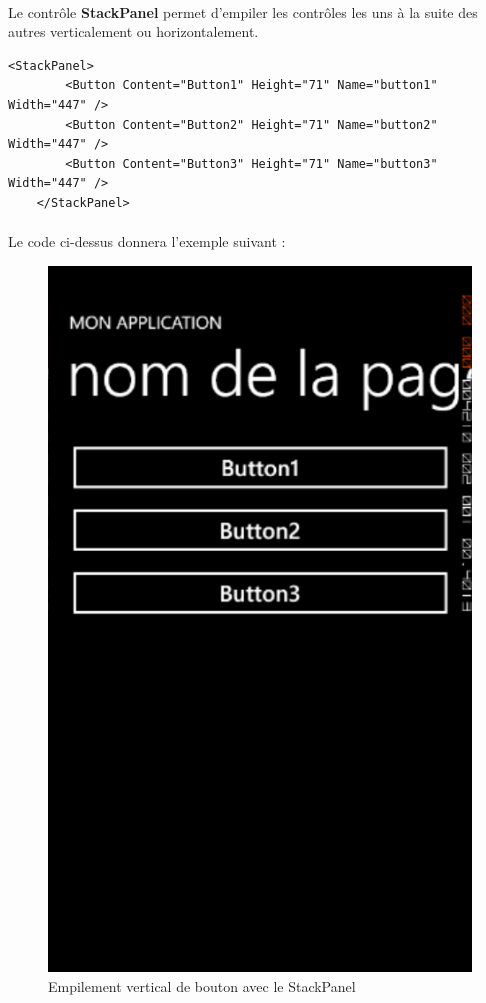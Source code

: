 \documentclass[twoside,UTF8]{EPURapport}
\begin{document}
\paragraph{}
Le contrôle \textbf{StackPanel} permet d’empiler les contrôles les uns à la suite des
autres verticalement ou horizontalement. 

\begin{lstlisting}[caption={Exemple d'utilisation du contrôle \textbf{StackPanel}}]
	<StackPanel>
		<Button Content="Button1" Height="71" Name="button1" Width="447" />
		<Button Content="Button2" Height="71" Name="button2" Width="447" />
		<Button Content="Button3" Height="71" Name="button3" Width="447" />
	</StackPanel>
\end{lstlisting}
	
\paragraph{}
Le code ci-dessus donnera l'exemple suivant : 

\begin{figure}[H]
	\center
	\includegraphics[scale=0.3]{images/stackpanel.png}
	\caption{Empilement vertical de bouton avec le StackPanel}
\end{figure}	
		
\end{document}
